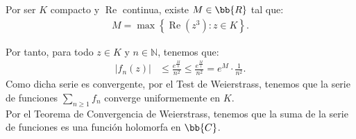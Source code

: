 \documentclass[12pt]{article}
\renewcommand{\Re}{\operatorname{Re}} %
\begin{document}
\begin{ejercicio}[2.5 puntos]
\begin{enumerate}
            Por ser $K$ compacto y $\Re$ continua, existe $M\in \bb{R}$ tal que:
            \begin{align*}
                M=\max\left\{\Re(z^3) : z\in K\right\}.
            \end{align*}

            Por tanto, para todo $z\in K$ y $n\in \mathbb{N}$, tenemos que:
            \begin{align*}
                |f_n(z)| &\leq \frac{e^{\frac{M}{n}}}{n^2} \leq \frac{e^{\frac{M}{1}}}{n^2}
                = e^M\cdot \frac{1}{n^2}.
            \end{align*}
            Como dicha serie es convergente, por el Test de Weierstrass, tenemos que la serie de funciones $\sum\limits_{n\geq 1} f_n$ converge uniformemente en $K$.\\

            Por el Teorema de Convergencia de Weierstrass, tenemos que la suma de la serie de funciones es una función holomorfa en $\bb{C}$.
        \end{enumerate}
    \end{ejercicio}
\end{document}
